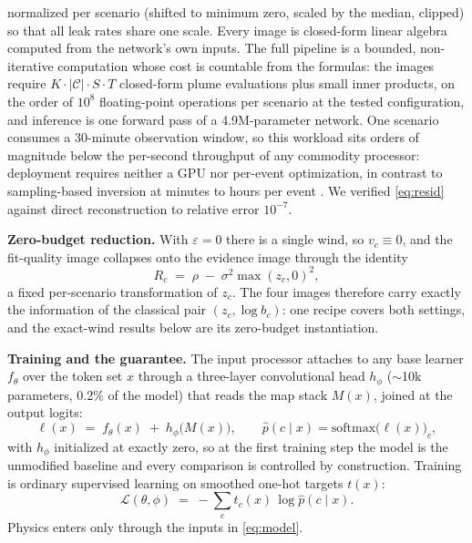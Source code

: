 \documentclass[conference]{IEEEtran}
\begin{document}
normalized per scenario (shifted to minimum zero, scaled by the median,
clipped) so that all leak rates share one scale. Every image is
closed-form linear algebra computed from the network's own inputs.
The full pipeline is a bounded, non-iterative computation whose cost
is countable from the formulas: the images require
$K \cdot |\mathcal{C}| \cdot S \cdot T$ closed-form plume evaluations
plus small inner products, on the order of $10^8$ floating-point
operations per scenario at the tested configuration, and inference is
one forward pass of a 4.9M-parameter network. One scenario consumes a
30-minute observation window, so this workload sits orders of magnitude
below the per-second throughput of any commodity processor: deployment
requires neither a GPU nor per-event optimization, in contrast to
sampling-based inversion at minutes to hours per event \cite{newman}. We verified \eqref{eq:resid} against direct
reconstruction to relative error $10^{-7}$.

\textbf{Zero-budget reduction.} With $\varepsilon = 0$ there is a single
wind, so $v_c \equiv 0$, and the fit-quality image collapses onto the
evidence image through the identity
\begin{equation}
\label{eq:reduction}
R_c \;=\; \rho \;-\; \sigma^2 \max(z_c, 0)^2,
\end{equation}
a fixed per-scenario transformation of $z_c$. The four images therefore
carry exactly the information of the classical pair $(z_c, \log b_c)$:
one recipe covers both settings, and the exact-wind results below are its
zero-budget instantiation.

\textbf{Training and the guarantee.}\label{sec:conf} The input
processor attaches to any base learner $f_\theta$ over the
token set $x$ through a three-layer convolutional head $h_\phi$
($\sim$10k parameters, 0.2\% of the model) that reads the map stack
$M(x)$, joined at the output logits:
\begin{equation}
\label{eq:model}
\ell(x) \;=\; f_\theta(x) \;+\; h_\phi\big(M(x)\big), \qquad
\hat p(c \mid x) = \mathrm{softmax}\big(\ell(x)\big)_c,
\end{equation}
with $h_\phi$ initialized at exactly zero, so at the first training step
the model is the unmodified baseline and every comparison is controlled
by construction. Training is ordinary supervised learning on smoothed
one-hot targets $t(x)$:
\begin{equation}
\label{eq:loss}
\mathcal{L}(\theta,\phi) \;=\;
-\sum_{c} t_c(x)\, \log \hat p(c \mid x).
\end{equation}
Physics enters only through the inputs in \eqref{eq:model}.
\end{document}
